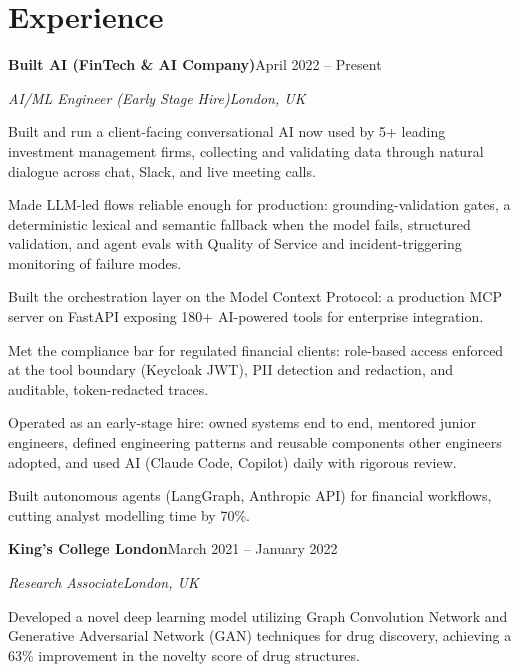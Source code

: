\documentclass[10pt,a4paper]{article}
\newcommand{\entry}[4]{%
  {\color{company}\bfseries #1}\hfill {\color{muted}#2}\par
  \vspace{1pt}
  {\itshape #3}\hfill {\color{muted}\itshape #4}\par
  \vspace{3pt}%
}
\begin{document}
\section{Experience}
\entry{Built AI (FinTech \& AI Company)}{April 2022 -- Present}{AI/ML Engineer (Early Stage Hire)}{London, UK}
\begin{tight}
  \item Built and run a client-facing conversational AI now used by 5+ leading investment management firms, collecting and validating data through natural dialogue across chat, Slack, and live meeting calls.
  \item Made LLM-led flows reliable enough for production: grounding-validation gates, a deterministic lexical and semantic fallback when the model fails, structured validation, and agent evals with Quality of Service and incident-triggering monitoring of failure modes.
  \item Built the orchestration layer on the Model Context Protocol: a production MCP server on FastAPI exposing 180+ AI-powered tools for enterprise integration.
  \item Met the compliance bar for regulated financial clients: role-based access enforced at the tool boundary (Keycloak JWT), PII detection and redaction, and auditable, token-redacted traces.
  \item Operated as an early-stage hire: owned systems end to end, mentored junior engineers, defined engineering patterns and reusable components other engineers adopted, and used AI (Claude Code, Copilot) daily with rigorous review.
  \item Built autonomous agents (LangGraph, Anthropic API) for financial workflows, cutting analyst modelling time by 70\%.
\end{tight}

\entry{King's College London}{March 2021 -- January 2022}{Research Associate}{London, UK}
\begin{tight}
  \item Developed a novel deep learning model utilizing Graph Convolution Network and Generative Adversarial Network (GAN) techniques for drug discovery, achieving a 63\% improvement in the novelty score of drug structures.
\end{tight}

\end{document}
